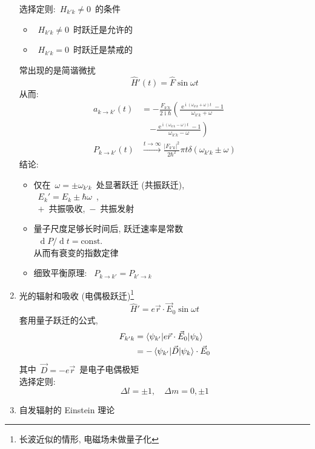\documentclass[11pt,a4paper,twocolumn,fleqn]{article}%
\DeclareMathOperator{\dif}{d}
\DeclareMathOperator{\mi}{i}
\DeclareMathOperator{\e}{e}%
\renewcommand{\[}{~$}
\renewcommand{\]}{$~}%
\begin{document}
\begin{enumerate}
	选择定则:\[H_{k'k}\neq 0\]的条件
	\begin{itemize}
	 \item \[H_{k'k}\neq 0\]时跃迁是允许的
	 \item \[H_{k'k} = 0\]时跃迁是禁戒的
	\end{itemize}
	常出现的是简谐微扰
	\begin{equation}
	 \hat H'(t) = \hat F\sin\omega t
	\end{equation}
	从而:
	\begin{align}
	 a_{k\to k'}(t) &= -\frac{F_{k'k}}{2\mi\hbar}\left(\frac{\e^{\mi(\omega_{k'k} + \omega)t}-1}{\omega_{k'k} + \omega} \right.\nonumber\\ & \quad \left. - \frac{\e^{\mi(\omega_{k'k} - \omega)t}-1}{\omega_{k'k} - \omega}\right) \\
	 P_{k\to k'}(t) &\overset{t\to\infty}{\longrightarrow} \frac{|F_{k'k}|^2}{2\hbar^2}\pi t\delta(\omega_{k'k}\pm\omega)
	\end{align}
	结论:
	\begin{itemize}
	 \item 仅在\[\omega = \pm\omega_{k'k}\]处显著跃迁 (共振跃迁), \\
		 \[E_k' = E_k \pm\hbar\omega\], \\
		 \[+\]共振吸收,\[-\]共振发射
	 \item 量子尺度足够长时间后, 跃迁速率是常数\\
	 	\[\dif P/\dif t = \mbox{const.}\]\\
	 	从而有衰变的指数定律
	 \item 细致平衡原理: \[P_{k\to k'} = P_{k'\to k}\]
	\end{itemize}
  \item 光的辐射和吸收 (电偶极跃迁)\footnote{长波近似的情形, 电磁场未做量子化}
  	\begin{equation}
  	 \hat H' = e\vec r\cdot\vec E_0\sin\omega t
  	\end{equation}
  	套用量子跃迁的公式, 
  	\begin{align}
  	 F_{k'k} &= \braket{\psi_{k'}|e\vec r\cdot\vec E_0|\psi_k} \\
  	 &= -\braket{\psi_{k'}|\vec D|\psi_k}\cdot\vec E_0
  	\end{align}
  	其中\[\vec D = -e\vec r\]是电子电偶极矩\\
  	选择定则:
  	\begin{equation}
  	 \Delta l = \pm 1, \quad \Delta m = 0, \pm 1
  	\end{equation}
  \item 自发辐射的 Einstein 理论

\end{enumerate}
\end{document}
